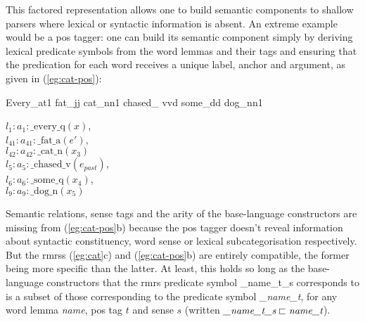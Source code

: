 This factored representation allows one to build semantic components
to shallow parsers where lexical or syntactic information is absent.
An extreme example would be a {\sc 
  pos} tagger: one can build its semantic component simply by deriving
lexical predicate symbols from the word lemmas and their tags and ensuring
that the predication for each word receives a unique label, anchor and
argument, as given in (\ref{eg:cat-pos}):
\begin{examples}
\item   \label{eg:cat-pos}
\begin{subexamples}
\item   Every\_{\sc at1} fat\_{\sc jj} cat\_{\sc nn1} chased\_{\sc
    vvd} some\_{\sc dd} dog\_{\sc nn1}
\item   $l_1:a_1:\mbox{\_every\_q}(x)$, \\
$l_{41}:a_{41}:\mbox{\_fat\_a}(e')$,\\
$l_{42}:a_{42}:\mbox{\_cat\_n}(x_3)$\\
$l_5:a_5:\mbox{\_chased\_v}(e_{past})$, \\
$l_6:a_6:\mbox{\_some\_q}(x_4)$, \\
$l_9:a_9:\mbox{\_dog\_n}(x_5)$
\end{subexamples}
\end{examples}
Semantic relations, sense tags and the arity of the base-language
constructors are
missing from (\ref{eg:cat-pos}b) because the {\sc pos} tagger doesn't
reveal information about syntactic constituency, word sense or lexical
subcategorisation respectively.  
But the {\sc rmrs}s (\ref{eg:cat}c) and
(\ref{eg:cat-pos}b) are entirely compatible, the former being more
specific than the latter.  At least, this holds so long as the
base-language constructors that the {\sc rmrs} predicate symbol
{\_name\_t\_s} corresponds to is a 
subset of those corresponding to the predicate symbol {\em \_name\_t},
for any word lemma {\em name}, {\sc pos} tag $t$ and sense $s$ (written 
$\mbox{{\em \_name\_t\_s}} \sqsubset \mbox{{\em name\_t}}$). 

